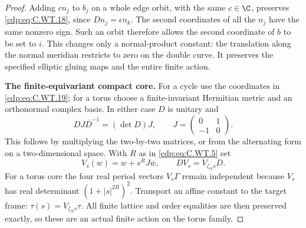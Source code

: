 \begin{proof}
Adding \(c n_j\) to \(b_j\) on
a whole edge orbit, with the
same \(c\in\C\), preserves
\eqref{cdp:eq:C.WT.18}, since
\(Dn_j=\epsilon n_k\).
The second coordinates of all
the \(n_j\) have the same
nonzero sign. Such an orbit
therefore allows the second
coordinate of \(b\) to be
set to \(i\). This changes
only a normal-product constant:
the translation along the
normal meridian restricts
to zero on the double curve.
It preserves the specified
elliptic gluing maps and the
entire finite action.

\par\medskip\noindent\textbf{The finite-equivariant compact core.}
For a cycle use the coordinates
in \eqref{cdp:eq:C.WT.19}; for a torus choose
a finite-invariant Hermitian
metric and an orthonormal
complex basis. In either case
\(D\) is unitary and
\[
 D J\overline D^{-1}=(\det D)J,
       \qquad J=\begin{pmatrix}0&1\\-1&0\end{pmatrix}.
 \tag{C.WT.20}\label{cdp:eq:C.WT.20}
\]
This follows by multiplying
the two-by-two matrices, or
from the alternating form
on a two-dimensional space.
With \(R\) as in \eqref{cdp:eq:C.WT.5} set
\[
 V_s(w)=w+s^R J\overline w,\qquad
             D V_s=V_{\zeta_Ns}D .
 \tag{C.WT.21}\label{cdp:eq:C.WT.21}
\]
For a torus core the four
real period vectors \(V_s\Gamma\)
remain independent because
\(V_s\) has real determinant
\((1+|s|^{2R})^2\).
Transport an affine constant
to the target frame:
\(\tau(s)=V_{\zeta_Ns}\tau\).
All finite lattice and order
equalities are then preserved
exactly, so these are an actual
finite action on the torus
family.


\end{proof}
